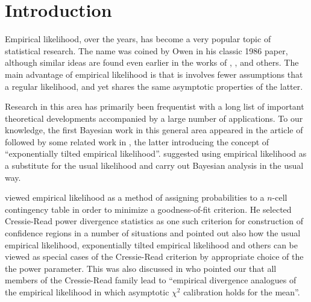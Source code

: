 \documentclass[oneside,english]{amsbook}
\numberwithin{section}{chapter}
\numberwithin{equation}{section}
\numberwithin{figure}{section}
\theoremstyle{plain}
\theoremstyle{plain}
\theoremstyle{definition}
\theoremstyle{plain}
\theoremstyle{plain}
\theoremstyle{remark}
\theoremstyle{definition}
\theoremstyle{definition}
\begin{document}
\section{Introduction}

Empirical likelihood, over the years, has become a very popular topic
of statistical research. The name was coined by Owen in his classic
1986 paper, although similar ideas are found even earlier in the works
of \citet{hartley1968new}, \citet{thomas1975confidence}, \citet{rubin1981bayesian}
and others. The main advantage of empirical likelihood is that is
involves fewer assumptions that a regular likelihood, and yet shares
the same asymptotic properties of the latter. 

Research in this area has primarily been frequentist with a long list
of important theoretical developments accompanied by a large number
of applications. To our knowledge, the first Bayesian work in this
general area appeared in the article of \citet{lazar2003bayesian}
followed by some related work in \citet{schennach2005bayesian,schennach2007point}
, the latter introducing the concept of ``exponentially tilted empirical
likelihood''. \citet{lazar2003bayesian} suggested using empirical
likelihood as a substitute for the usual likelihood and carry out
Bayesian analysis in the usual way. 

\citet{baggerly1998empirical} viewed empirical likelihood as a method
of assigning probabilities to a $n$-cell contingency table in order
to minimize a goodness-of-fit criterion. He selected Cressie-Read
power divergence statistics as one such criterion for construction
of confidence regions in a number of situations and pointed out also
how the usual empirical likelihood, exponentially tilted empirical
likelihood and others can be viewed as special cases of the Cressie-Read
criterion by appropriate choice of the the power parameter. This was
also discussed in \citet{owen2010empirical} who pointed our that
all members of the Cressie-Read family lead to ``empirical divergence
analogues of the empirical likelihood in which asymptotic $\chi^{2}$
calibration holds for the mean''.
\end{document}
